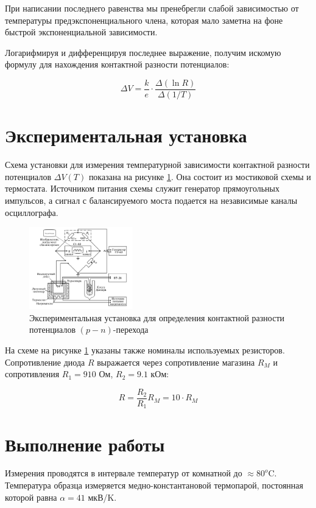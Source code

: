 \documentclass[12pt]{kiarticle} %
\begin{document}
	При написании последнего равенства мы пренебрегли слабой зависимостью от температуры предэкспоненциального члена, которая
	мало заметна на фоне быстрой экспоненциальной зависимости.
	
	Логарифмируя и дифференцируя последнее выражение, получим искомую формулу для нахождения контактной разности потенциалов:
	
	\begin{equation}\label{dV}
	\Delta V = \frac{k}{e}\cdot \frac{\Delta(\ln R)}{\Delta(1/T)}
	\end{equation}
	
		\section{Экспериментальная установка}
	
	Схема установки для измерения температурной зависимости контактной разности потенциалов $\Delta V(T)$ показана на рисунке \ref{pic:scheme}. Она состоит из мостиковой схемы и термостата. Источником питания схемы служит генератор прямоугольных импульсов, а сигнал с балансируемого моста подается на независимые каналы осциллографа. 
	
		\begin{figure}[h]
		\centering	
		\includegraphics[width=0.4\textwidth]{scheme.png}
		\caption{Экспериментальная установка для определения контактной разности потенциалов $(p-n)$-перехода}
		\label{pic:scheme}
	\end{figure} 

	
	На схеме на рисунке \ref{pic:scheme} указаны также номиналы используемых резисторов. Сопротивление диода $R$ выражается через сопротивление магазина $R_M$ и сопротивления $R_1 = 910$ Ом, $R_2 = 9.1$ кОм:
	
	\[ R = \frac{R_2}{R_1}R_M = 10\cdot R_M \] 
	
	\section{Выполнение работы}
	
	Измерения проводятся в интервале температур от комнатной до $\approx 80^o$C. Температура образца измеряется медно-константановой термопарой, постоянная которой равна $\alpha = 41$ мкВ/K.
	
\end{document}
